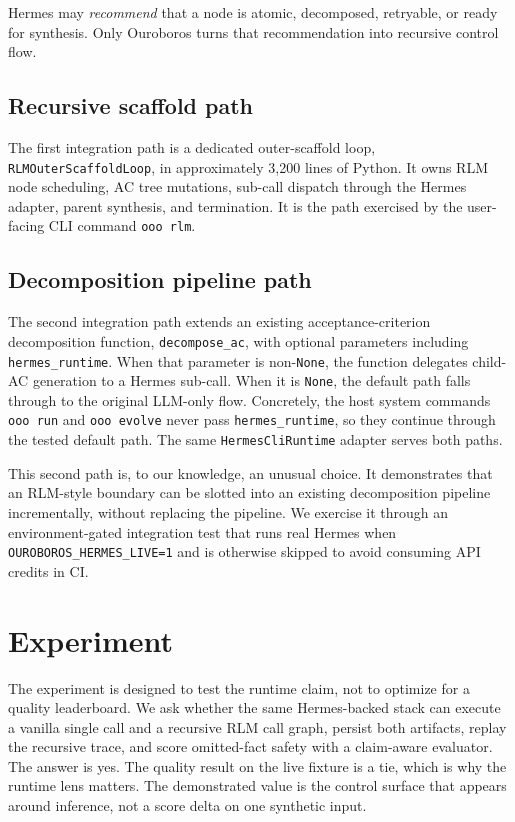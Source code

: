 \documentclass[11pt,a4paper]{article}
\begin{document}
Hermes may \emph{recommend} that a node is atomic, decomposed, retryable,
or ready for synthesis. Only Ouroboros turns that recommendation into
recursive control flow.

\subsection{Recursive scaffold path}
\label{sec:scaffold}

The first integration path is a dedicated outer-scaffold loop,
\texttt{RLMOuterScaffoldLoop}, in approximately 3{,}200 lines of Python.
It owns RLM node scheduling, AC tree mutations, sub-call dispatch through
the Hermes adapter, parent synthesis, and termination. It is the path
exercised by the user-facing CLI command \texttt{ooo rlm}.

\subsection{Decomposition pipeline path}
\label{sec:decomposition}

The second integration path extends an existing acceptance-criterion
decomposition function, \texttt{decompose\_ac}, with optional parameters
including \texttt{hermes\_runtime}. When that parameter is non-\texttt{None},
the function delegates child-AC generation to a Hermes sub-call. When it is
\texttt{None}, the default path falls through to the original LLM-only flow.
Concretely, the host system commands \texttt{ooo run} and
\texttt{ooo evolve} never pass \texttt{hermes\_runtime}, so they
continue through the tested default path. The same \texttt{HermesCliRuntime}
adapter serves both paths.

This second path is, to our knowledge, an unusual choice. It demonstrates
that an RLM-style boundary can be slotted into an existing
decomposition pipeline incrementally, without replacing the pipeline.
We exercise it through an environment-gated integration test that runs
real Hermes when \texttt{OUROBOROS\_HERMES\_LIVE=1} and is otherwise
skipped to avoid consuming API credits in CI.

\section{Experiment}
\label{sec:experiment}

The experiment is designed to test the runtime claim, not to optimize for a
quality leaderboard. We ask whether the same Hermes-backed stack can execute
a vanilla single call and a recursive RLM call graph, persist both artifacts,
replay the recursive trace, and score omitted-fact safety with a claim-aware
evaluator. The answer is yes. The quality result on the live fixture is a
tie, which is why the runtime lens matters. The demonstrated value is the
control surface that appears around inference, not a score delta on one
synthetic input.
\end{document}

